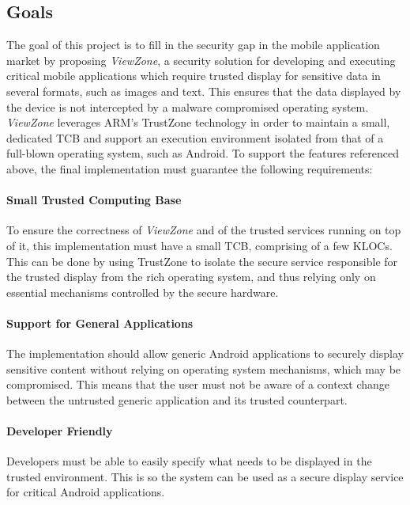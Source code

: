 \subsection{Goals}
The goal of this project is to fill in the security gap in the mobile application market by proposing \emph{ViewZone}, a security solution for developing and executing critical mobile applications which require trusted display for sensitive data in several formats, such as images and text. This ensures that the data displayed by the device is not intercepted by a malware compromised operating system. \emph{ViewZone} leverages ARM's TrustZone technology in order to maintain a small, dedicated \ac{TCB} and support an execution environment isolated from that of a full-blown operating system, such as Android.
To support the features referenced above, the final implementation must guarantee the following requirements:

\paragraph*{\textbf{Small Trusted Computing Base\\}} To ensure the correctness of \emph{ViewZone} and of the trusted services running on top of it, this implementation must have a small \ac{TCB}, comprising of a few KLOCs. This can be done by using TrustZone to isolate the secure service responsible for the trusted display from the rich operating system, and thus relying only on essential mechanisms controlled by the secure hardware.

\paragraph*{\textbf{Support for General Applications\\}} The implementation should allow generic Android applications to securely display sensitive content without relying on operating system mechanisms, which may be compromised. This means that the user must not be aware of a context change between the untrusted generic application and its trusted counterpart.

\paragraph*{\textbf{Developer Friendly\\}} Developers must be able to easily specify what needs to be displayed in the trusted environment. This is so the system can be used as a secure display service for critical Android applications.\\

